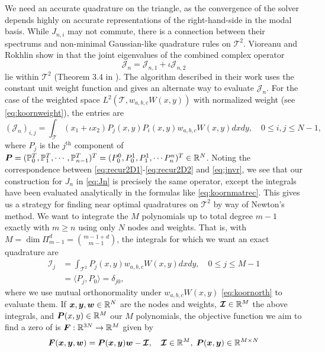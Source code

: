 We need an accurate quadrature on the triangle, as the convergence of the solver depends highly on accurate representations of the right-hand-side in the modal basis. While $J_{n,i}$ may not commute, there is a connection between their spectrums and non-minimal Gaussian-like quadrature rules on $\mathcal{T}^2$. Vioreanu and Rokhlin show in \cite{vrquad} that the joint eigenvalues of the combined complex operator 
\begin{equation}\label{eq:Jn}
	\mathcal{J}_n = \mathcal{J}_{n,1}+\iota \mathcal{J}_{n,2}
\end{equation}	
lie within $\mathcal{T}^2$ (Theorem 3.4 in \cite{vrquad}). The algorithm described in their work uses the constant unit weight function and gives an alternate way to evaluate $\mathcal{J}_{n}$. For the case of the weighted space $L^2(\mathcal{T},w_{a,b,c}W(x,y))$ with normalized weight (see \eqref{eq:koornweight}), the entries are
\begin{equation}\label{eq:jnvr}
(\mathcal{J}_n)_{i,j} = \int_{\mathcal{T}} (x_1+\iota x_2)P_j(x,y)P_i(x,y)w_{a,b,c}W(x,y)dxdy,\quad 0\leq i,j\leq N-1,
\end{equation}
where $P_j$ is the $j^\text{th}$ component of $\boldsymbol{P} = (\mathbb{P}_0^T,\mathbb{P}_1^T,\cdots,\mathbb{P}_{n-1}^T)^T = (P_0^0,P_0^1,P_1^1,\cdots P_n^n)^T \in \mathbb{R}^N$. Noting the correspondence between \eqref{eq:recur2D1}-\eqref{eq:recur2D2} and \eqref{eq:jnvr}, we see that our construction for $J_n$ in \eqref{eq:Jn} is precisely the same operator, except the integrals have been evaluated analytically in the formulas like \eqref{eq:koornmatrec}. This gives us a strategy for finding near optimal quadratures on $\mathcal{T}^2$ by way of Newton's method. We want to integrate the $M$ polynomials up to total degree $m-1$ exactly with $m \geq n$ using only $N$ nodes and weights. That is, with $M=\dim\Pi_{m-1}^d = {m-1+d\choose m-1}$, the integrals for which we want an exact quadrature are
\begin{equation}\label{eq:exactint}
\begin{split}
\mathcal{I}_j &= \int_{\mathcal{T}^2} P_j(x,y)w_{a,b,c}W(x,y)dxdy,\quad 0\leq j \leq M-1\\
&=\langle P_j,P_0\rangle = \delta_{j0},
\end{split}
\end{equation}
where we use mutual orthonormality under $w_{a,b,c}W(x,y)$ \eqref{eq:koornorth} to evaluate them. If $\boldsymbol{x},\boldsymbol{y},\boldsymbol{w} \in \mathbb{R}^N$ are the nodes and weights, $\boldsymbol{\mathcal{I}} \in \mathbb{R}^M$ the above integrals, and $\boldsymbol{P}(x,y)\in \mathbb{R}^M$ our $M$ polynomials, the objective function we aim to find a zero of is $\boldsymbol{F}:\mathbb{R}^{3N}\to\mathbb{R}^M$ given by
\begin{equation}\label{eq:newtobj}
	\boldsymbol{F}(\boldsymbol{x},\boldsymbol{y},\boldsymbol{w}) = \boldsymbol{P}(\boldsymbol{x},\boldsymbol{y})\boldsymbol{w}-\boldsymbol{\mathcal{I}},\quad  \boldsymbol{\mathcal{I}}\in\mathbb{R}^M,\;\boldsymbol{P}(\boldsymbol{x},\boldsymbol{y}) \in \mathbb{R}^{M\times N}
\end{equation}

